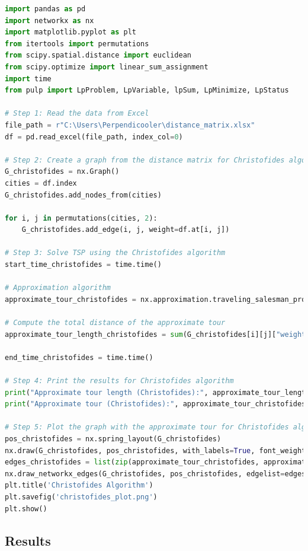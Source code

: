\begin{lstlisting}[language=Python, caption={Christofides Algorithm Implementation}]
import pandas as pd
import networkx as nx
import matplotlib.pyplot as plt
from itertools import permutations
from scipy.spatial.distance import euclidean
from scipy.optimize import linear_sum_assignment
import time
from pulp import LpProblem, LpVariable, lpSum, LpMinimize, LpStatus

# Step 1: Read the data from Excel
file_path = r"C:\Users\Perpendicooler\distance_matrix.xlsx"
df = pd.read_excel(file_path, index_col=0)

# Step 2: Create a graph from the distance matrix for Christofides algorithm
G_christofides = nx.Graph()
cities = df.index
G_christofides.add_nodes_from(cities)

for i, j in permutations(cities, 2):
    G_christofides.add_edge(i, j, weight=df.at[i, j])

# Step 3: Solve TSP using the Christofides algorithm
start_time_christofides = time.time()

# Approximation algorithm
approximate_tour_christofides = nx.approximation.traveling_salesman_problem(G_christofides, weight="weight", cycle=True)

# Compute the total distance of the approximate tour
approximate_tour_length_christofides = sum(G_christofides[i][j]["weight"] for i, j in zip(approximate_tour_christofides, approximate_tour_christofides[1:]))

end_time_christofides = time.time()

# Step 4: Print the results for Christofides algorithm
print("Approximate tour length (Christofides):", approximate_tour_length_christofides)
print("Approximate tour (Christofides):", approximate_tour_christofides)

# Step 5: Plot the graph with the approximate tour for Christofides algorithm
pos_christofides = nx.spring_layout(G_christofides)
nx.draw(G_christofides, pos_christofides, with_labels=True, font_weight="bold")
edges_christofides = list(zip(approximate_tour_christofides, approximate_tour_christofides[1:]))
nx.draw_networkx_edges(G_christofides, pos_christofides, edgelist=edges_christofides, edge_color="r", width=2)
plt.title('Christofides Algorithm')
plt.savefig('christofides_plot.png')
plt.show()
\end{lstlisting}
\newpage
\subsection*{Results}
